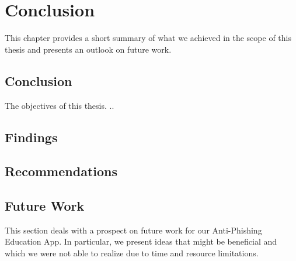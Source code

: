 \section{Conclusion}
\label{s:conclusion}

This chapter provides a short summary of what we achieved in the scope of this thesis and presents an outlook on future work.



\subsection{Conclusion}

The objectives of this thesis.
.. 

\subsection{Findings}
\subsection{Recommendations}
\subsection{Future Work}
This section deals with a prospect on future work for our Anti-Phishing Education App.
 In particular, we present ideas that might be beneficial and which we were not able to realize due to time and resource limitations.

